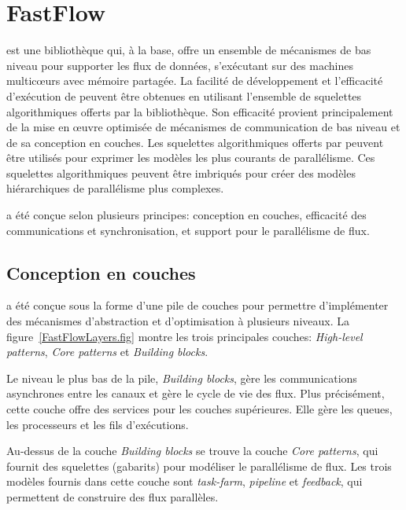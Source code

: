 \section{FastFlow}



 est une biblioth\`eque  qui, \`a la base, offre un ensemble de m\'ecanismes de bas niveau pour supporter les flux de donn\'ees, s'ex\'ecutant sur des machines multicœurs avec m\'emoire partag\'ee. La facilit\'e de d\'eveloppement et l'efficacit\'e d'ex\'ecution de  peuvent \^etre obtenues en utilisant l'ensemble de squelettes algorithmiques offerts par la biblioth\`eque. Son efficacit\'e provient principalement de la mise en œuvre optimis\'ee de m\'ecanismes de communication de bas niveau et de sa conception en couches. Les squelettes algorithmiques offerts par  peuvent \^etre utilis\'es pour exprimer les mod\`eles les plus courants de parall\'elisme. Ces squelettes algorithmiques peuvent \^etre imbriqu\'es pour cr\'eer des mod\`eles hi\'erarchiques de parall\'elisme plus complexes.

 a \'et\'e conçue selon plusieurs principes: conception en couches, efficacit\'e des communications et synchronisation, et support pour le parall\'elisme de flux.

\subsection{Conception en couches}


 a \'et\'e conçue sous la forme d'une pile de couches pour permettre d'impl\'ementer des m\'ecanismes d'abstraction et d'optimisation \`a plusieurs niveaux. La figure~\ref{FastFlowLayers.fig} montre les trois principales couches: \emph{High-level patterns}, \emph{Core patterns} et \emph{Building blocks}. 

Le niveau le plus bas de la pile, \emph{Building blocks}, g\`ere les communications asynchrones entre les canaux et g\`ere le cycle de vie des flux. Plus pr\'ecis\'ement, cette couche offre des services pour les couches sup\'erieures. Elle g\`ere les queues, les processeurs et les fils d'ex\'ecutions.

Au-dessus de la couche \emph{Building blocks} se trouve la couche \emph{Core patterns}, qui fournit des squelettes (gabarits) pour mod\'eliser le parall\'elisme de flux. Les trois mod\`eles fournis dans cette couche sont \emph{task-farm}, \emph{pipeline} et \emph{feedback}, qui permettent de construire des flux parall\`eles. 

